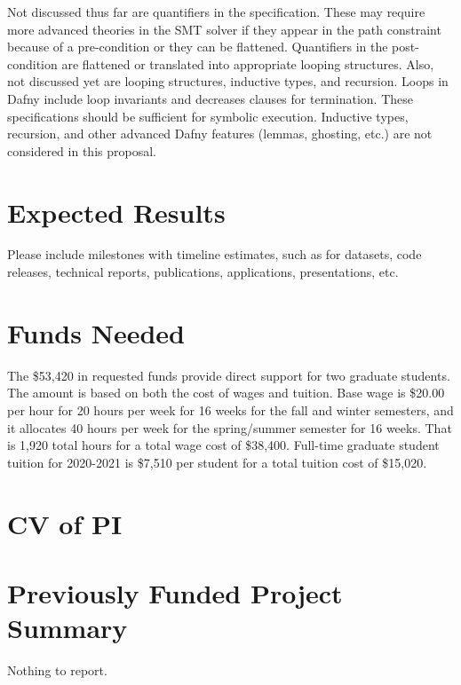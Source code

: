 \documentclass[11pt,onecolumn,notitlepage]{article}
\begin{document}
\begin{comment}
Symbolic execution must track side-effecting calls and introduce new uninterpreted functions as appropriate. For example, a second call to \texttt{T.isF(f : int)} should create a new uninterpreted function since its value might be different from the first call, and such information should be captured in the symbol table and path constraint as appropriate. Also note that it is possible to skip the secondary constraint problem with the flattened contracts to rather over-approximate actual program behavior using mocks. The mocks can be configured to return the needed sequence of program values to test the path. Depending on the code being tested, such an over-approximation may be sufficient for the test though there are two things to consider: first, what if such a path is not feasible in any real execution (i.e., there does not exist any input that would exercise that path); and second, what does a passing or failing test mean? Here it is not clear if such an over-approximation is sound and the question merits further investigation.
\end{comment}

Not discussed thus far are quantifiers in the specification. These may require more advanced theories in the SMT solver if they appear in the path constraint because of a pre-condition or they can be flattened. Quantifiers in the post-condition are flattened or translated into appropriate looping structures. Also, not discussed yet are looping structures, inductive types, and recursion. Loops in Dafny include loop invariants and decreases clauses for termination. These specifications should be sufficient for symbolic execution.  Inductive types, recursion, and other advanced Dafny features (lemmas, ghosting, etc.) are not considered in this proposal. 

\section*{Expected Results}
Please include milestones with timeline estimates, such as for datasets, code releases, technical reports, publications, applications, presentations, etc. 

\section*{Funds Needed}

The \$53,420 in requested funds provide direct support for two graduate students. The amount is based on both the cost of wages and tuition. Base wage is \$20.00 per hour for 20 hours per week for 16 weeks for the fall and winter semesters, and it allocates 40 hours per week for the spring/summer semester for 16 weeks. That is 1,920 total hours for a total wage cost of \$38,400. Full-time graduate student tuition for 2020-2021 is \$7,510 per student for a total tuition cost of \$15,020. 

\appendix
\appendixpage




\section{CV of PI}

\section{Previously Funded Project Summary}
Nothing to report.
\end{document}
